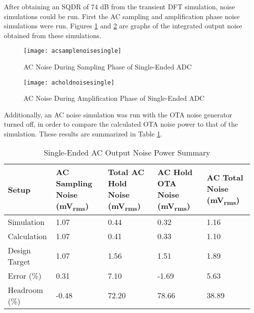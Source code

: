 After obtaining an SQDR of 74 dB from the transient DFT simulation, noise simulations could be run. First the AC sampling and amplification phase noise simulations were run. Figures \ref{fig:acsamplenoisesingle} and \ref{fig:acholdnoisesingle} are graphs of the integrated output noise obtained from these simulations.
\begin{figure}[htbp]
\centering
\texttt{[image: acsamplenoisesingle]}
\caption{AC Noise During Sampling Phase of Single-Ended ADC} 
\label{fig:acsamplenoisesingle}
\end{figure}
\begin{figure}[htbp]
\centering
\texttt{[image: acholdnoisesingle]}
\caption{AC Noise During Amplification Phase of Single-Ended ADC} 
\label{fig:acholdnoisesingle}
\end{figure}
Additionally, an AC noise simulation was run with the OTA noise generator turned off, in order to compare the calculated OTA noise power to that of the simulation. These results are summarized in Table \ref{tab:acnoisesummarysingle}.
\begin{table}[htbp]
\renewcommand*\arraystretch{1.3}
\begin{center}
\begin{tabularx}{\linewidth}{|l|X|X|X|X|}
\hline
Setup & AC Sampling Noise (\si{\milli\volt_{rms}}) & Total AC Hold Noise  (\si{\milli\volt_{rms}}) & AC Hold OTA Noise  (\si{\milli\volt_{rms}}) & AC Total Noise  (\si{\milli\volt_{rms}}) \\ \hline
Simulation & 1.07 & 0.44 & 0.32 & 1.16 \\ \hline
Calculation & 1.07 & 0.41 & 0.33 & 1.10 \\ \hline
Design Target & 1.07 & 1.56 & 1.51 & 1.89 \\ \hline
Error (\%) & 0.31 & 7.10 & -1.69 & 5.63 \\ \hline
Headroom (\%) & -0.48 & 72.20 & 78.66 & 38.89 \\ \hline
\end{tabularx}
\end{center}
\caption{Single-Ended AC Output Noise Power Summary}
\label{tab:acnoisesummarysingle}
\end{table}
